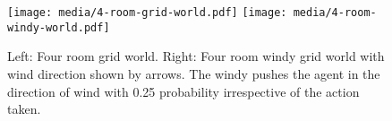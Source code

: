 %
\begin{figure}%
\texttt{[image: media/4-room-grid-world.pdf]}
\hfill
\texttt{[image: media/4-room-windy-world.pdf]}%
\caption{Left: Four room grid world. Right: Four room windy grid world with wind direction shown by arrows. The windy pushes the agent in the direction of wind with 0.25 probability irrespective of the action taken.}
\label{fig:four-room-grid-world}%
\end{figure}%

